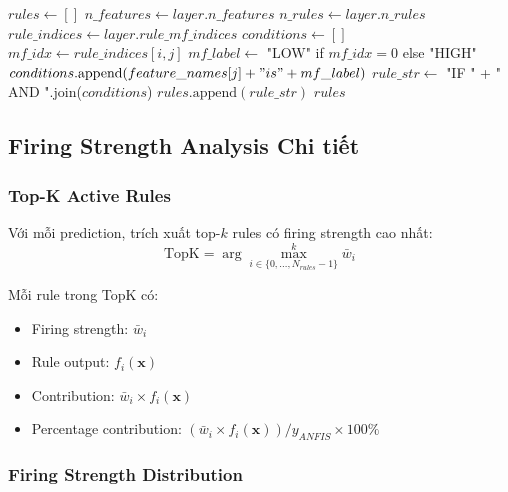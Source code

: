 \documentclass[12pt,a4paper]{article}
\begin{document}
\begin{algorithmic}
    \State $rules \gets []$
            \State $n\_features \gets layer.n\_features$
            \State $n\_rules \gets layer.n\_rules$
            \State $rule\_indices \gets layer.rule\_mf\_indices$
                \State $conditions \gets []$
                    \State $mf\_idx \gets rule\_indices[i, j]$
                    \State $mf\_label \gets$ "LOW" if $mf\_idx = 0$ else "HIGH"
                    \State $conditions.\text{append}(feature\_names[j] + " is " + mf\_label)$
                \EndFor
                \State $rule\_str \gets$ "IF " + " AND ".join($conditions$)
                \State $rules.\text{append}(rule\_str)$
            \EndFor
        \EndIf
    \EndFor
    \State \Return $rules$
\EndFunction
\end{algorithmic}

\subsection{Firing Strength Analysis Chi tiết}

\subsubsection{Top-K Active Rules}

Với mỗi prediction, trích xuất top-$k$ rules có firing strength cao nhất:
\begin{equation}
\text{TopK} = \arg\max_{i \in \{0, \ldots, N_{rules}-1\}}^k \bar{w}_i
\end{equation}

Mỗi rule trong TopK có:
\begin{itemize}
    \item Firing strength: $\bar{w}_i$
    \item Rule output: $f_i(\mathbf{x})$
    \item Contribution: $\bar{w}_i \times f_i(\mathbf{x})$
    \item Percentage contribution: $(\bar{w}_i \times f_i(\mathbf{x})) / y_{ANFIS} \times 100\%$
\end{itemize}

\subsubsection{Firing Strength Distribution}
\end{document}
